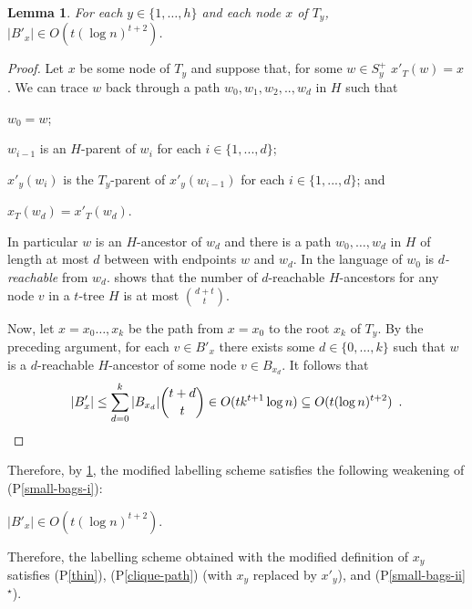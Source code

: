 \documentclass{patmorin}
\newcommand{\pref}[1]{(P\ref{#1})}
\newcommand{\psref}[1]{(P\ref{#1}$^{\star}$)}
\newtheorem{lemma}{Lemma}
\begin{document}
\begin{lemma}\label{small-bags-ii-lem}
    For each $y\in\{1,\ldots,h\}$ and each node $x$ of $T_y$, $|B'_x|\in O(t(\log n)^{t+2})$.
\end{lemma}

\begin{proof}
    Let $x$ be some node of $T_y$ and suppose that, for some $w\in S^+_y$ $x'_T(w)=x$.  We can trace $w$ back through a path $w_0,w_1,w_2,..,w_d$ in $H$ such that
    \begin{compactenum}[(a)]
        \item $w_0=w$;
        \item $w_{i-1}$ is an $H$-parent of $w_i$ for each $i\in\{1,...,d\}$;
        \item $x'_y(w_{i})$ is the $T_y$-parent of $x'_y(w_{i-1})$ for each $i\in\{1,...,d\}$; and
        \item $x_T(w_d)=x'_T(w_d)$.
    \end{compactenum}
    In particular $w$ is an $H$-ancestor of $w_d$ and there is a path $w_0,\ldots,w_d$ in $H$ of length at most $d$ between with endpoints $w$ and $w_d$.  In the language of \citet{pilipczuk.siebertz:polynomial} $w_0$ is \emph{$d$-reachable} from $w_d$.  \citet[Lemma~13]{pilipczuk.siebertz:polynomial-arxiv} shows that the number of $d$-reachable $H$-ancestors for any node $v$ in a $t$-tree $H$ is at most $\binom{d+t}{t}$.

    Now, let $x=x_0\ldots,x_k$ be the path from $x=x_0$ to the root $x_k$ of $T_y$. By the preceding argument, for each $v\in B'_x$ there exists some $d\in\{0,\ldots,k\}$ such that $w$ is a $d$-reachable $H$-ancestor of some node $v\in B_{x_d}$.  It follows that
    \[
        |B'_x|
            \le \sum_{d=0}^k |B_{x_d}|\binom{t+d}{t}
            \in O(tk^{t+1}\log n)
            \subseteq O(t(\log n)^{t+2}) \enspace . \qedhere
    \]
\end{proof}

Therefore, by \cref{small-bags-ii-lem}, the modified labelling scheme satisfies the following weakening of \pref{small-bags-i}:

\begin{compactenum}[(P1$^{\star}$)]\setcounter{enumi}{2}
    \item $|B'_x|\in O(t(\log n)^{t+2})$. \label{small-bags-ii}
\end{compactenum}

Therefore, the labelling scheme obtained with the modified definition of $x_y$ satisfies \pref{thin}, \pref{clique-path} (with $x_y$ replaced by $x'_y$), and \psref{small-bags-ii}.
\end{document}
